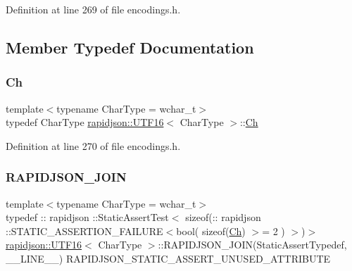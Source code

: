 Definition at line 269 of file encodings.\+h.



\subsection{Member Typedef Documentation}
\mbox{\label{structrapidjson_1_1_u_t_f16_acb67f53501b796b55996352a6080da54}} 
\subsubsection{\texorpdfstring{Ch}{Ch}}
{\footnotesize\ttfamily template$<$typename Char\+Type  = wchar\+\_\+t$>$ \\
typedef Char\+Type \mbox{\hyperlink{structrapidjson_1_1_u_t_f16}{rapidjson\+::\+U\+T\+F16}}$<$ Char\+Type $>$\+::\mbox{\hyperlink{structrapidjson_1_1_u_t_f16_acb67f53501b796b55996352a6080da54}{Ch}}}



Definition at line 270 of file encodings.\+h.

\mbox{\label{structrapidjson_1_1_u_t_f16_a504bdaba3bbc5345c15b6e44f708f994}} 
\subsubsection{\texorpdfstring{RAPIDJSON\_JOIN}{RAPIDJSON\_JOIN}}
{\footnotesize\ttfamily template$<$typename Char\+Type  = wchar\+\_\+t$>$ \\
typedef \+:: rapidjson \+::Static\+Assert\+Test$<$ sizeof(\+:: rapidjson \+::S\+T\+A\+T\+I\+C\+\_\+\+A\+S\+S\+E\+R\+T\+I\+O\+N\+\_\+\+F\+A\+I\+L\+U\+RE$<$bool( sizeof(\mbox{\hyperlink{structrapidjson_1_1_u_t_f16_acb67f53501b796b55996352a6080da54}{Ch}}) $>$= 2 ) $>$)$>$ \mbox{\hyperlink{structrapidjson_1_1_u_t_f16}{rapidjson\+::\+U\+T\+F16}}$<$ Char\+Type $>$\+::R\+A\+P\+I\+D\+J\+S\+O\+N\+\_\+\+J\+O\+IN(Static\+Assert\+Typedef, \+\_\+\+\_\+\+L\+I\+N\+E\+\_\+\+\_\+) R\+A\+P\+I\+D\+J\+S\+O\+N\+\_\+\+S\+T\+A\+T\+I\+C\+\_\+\+A\+S\+S\+E\+R\+T\+\_\+\+U\+N\+U\+S\+E\+D\+\_\+\+A\+T\+T\+R\+I\+B\+U\+TE}




